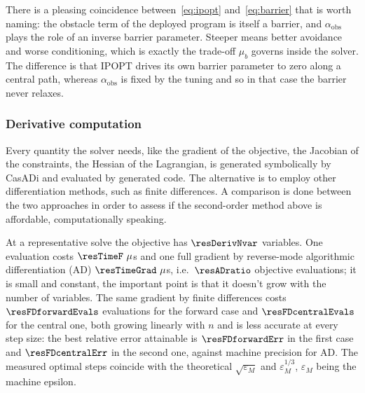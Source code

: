 \documentclass[11pt,a4paper]{article}
\newcommand{\aobs}{\alpha_{\mathrm{obs}}}
\begin{document}
There is a pleasing coincidence between~\eqref{eq:ipopt} and~\eqref{eq:barrier} that is worth naming: the
obstacle term of the deployed program is itself a barrier, and $\aobs$ plays the role of an inverse barrier
parameter. Steeper means better avoidance and worse conditioning, which is exactly the trade-off $\mu_b$
governs inside the solver. The difference is that IPOPT drives its own barrier parameter to zero along a
central path, whereas $\aobs$ is fixed by the tuning and so in that case the barrier never relaxes.

\subsubsection{Derivative computation}
\label{sec:deriv}

Every quantity the solver needs, like the gradient of the objective, the Jacobian of the constraints, the
Hessian of the Lagrangian, is generated symbolically by CasADi and evaluated by generated code. The
alternative is to employ other differentiation methods, such as finite differences. A comparison is done between the two approaches in order to assess if the
second-order method above is affordable, computationally speaking.

\begin{table}[htbp]
  \centering
  \small
  \caption{%
  Accuracy of the finite-difference gradient against the step size, measured against the AD gradient. The
  optimum sits at $h=1.49\times 10^{-8}$ forward (theory: $\sqrt{\varepsilon}=1.49\times 10^{-8}$) and
  $h=6.06\times 10^{-6}$ central (theory: $\varepsilon^{1/3}=6.06\times 10^{-6}$).}
  \label{res:tab:fd}
\end{table}

At a representative solve the objective has $\resDerivNvar$ variables. One evaluation costs
$\resTimeF~\mu$s and one full gradient by reverse-mode algorithmic differentiation (AD) $\resTimeGrad~\mu$s,
i.e.\ $\resADratio$ objective evaluations; it is small and constant, the important point is that it doesn't grow with the
number of variables. The same gradient by finite differences costs $\resFDforwardEvals$ evaluations for the forward case
and $\resFDcentralEvals$ for the central one, both growing linearly with $n$ and is less accurate at every step size:
the best relative error attainable is $\resFDforwardErr$ in the first case and $\resFDcentralErr$ in the second one, against 
machine precision for AD. The measured optimal steps coincide with the theoretical $\sqrt{\varepsilon_M}$ and 
$\varepsilon_M^{1/3}$, $\varepsilon_M$ being the machine epsilon.
\end{document}
